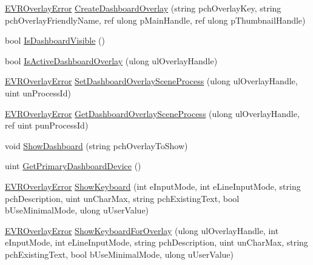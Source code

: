 \begin{DoxyCompactItemize}
\item 
\mbox{\hyperlink{namespace_valve_1_1_v_r_aaee5c5144f42b7969d45b854f51b0c18}{E\+V\+R\+Overlay\+Error}} \mbox{\hyperlink{class_valve_1_1_v_r_1_1_c_v_r_overlay_a3010fee626abfe4227ccbf2c53186508}{Create\+Dashboard\+Overlay}} (string pch\+Overlay\+Key, string pch\+Overlay\+Friendly\+Name, ref ulong p\+Main\+Handle, ref ulong p\+Thumbnail\+Handle)
\item 
bool \mbox{\hyperlink{class_valve_1_1_v_r_1_1_c_v_r_overlay_a2f8245632633538da1d5a48addc76559}{Is\+Dashboard\+Visible}} ()
\item 
bool \mbox{\hyperlink{class_valve_1_1_v_r_1_1_c_v_r_overlay_a68413569ad106e17b3503f392f11de76}{Is\+Active\+Dashboard\+Overlay}} (ulong ul\+Overlay\+Handle)
\item 
\mbox{\hyperlink{namespace_valve_1_1_v_r_aaee5c5144f42b7969d45b854f51b0c18}{E\+V\+R\+Overlay\+Error}} \mbox{\hyperlink{class_valve_1_1_v_r_1_1_c_v_r_overlay_ae2953273d370a8ecbbac3513392cfc09}{Set\+Dashboard\+Overlay\+Scene\+Process}} (ulong ul\+Overlay\+Handle, uint un\+Process\+Id)
\item 
\mbox{\hyperlink{namespace_valve_1_1_v_r_aaee5c5144f42b7969d45b854f51b0c18}{E\+V\+R\+Overlay\+Error}} \mbox{\hyperlink{class_valve_1_1_v_r_1_1_c_v_r_overlay_a1741a80ecf6cd56ce4374955e81791e4}{Get\+Dashboard\+Overlay\+Scene\+Process}} (ulong ul\+Overlay\+Handle, ref uint pun\+Process\+Id)
\item 
void \mbox{\hyperlink{class_valve_1_1_v_r_1_1_c_v_r_overlay_ac731a2fc3a7a6a3fc3bfb949545cf986}{Show\+Dashboard}} (string pch\+Overlay\+To\+Show)
\item 
uint \mbox{\hyperlink{class_valve_1_1_v_r_1_1_c_v_r_overlay_af060f8de9c6282c904fe3cc6ba6fc186}{Get\+Primary\+Dashboard\+Device}} ()
\item 
\mbox{\hyperlink{namespace_valve_1_1_v_r_aaee5c5144f42b7969d45b854f51b0c18}{E\+V\+R\+Overlay\+Error}} \mbox{\hyperlink{class_valve_1_1_v_r_1_1_c_v_r_overlay_a1f615d854db640debe761d4d9b43e118}{Show\+Keyboard}} (int e\+Input\+Mode, int e\+Line\+Input\+Mode, string pch\+Description, uint un\+Char\+Max, string pch\+Existing\+Text, bool b\+Use\+Minimal\+Mode, ulong u\+User\+Value)
\item 
\mbox{\hyperlink{namespace_valve_1_1_v_r_aaee5c5144f42b7969d45b854f51b0c18}{E\+V\+R\+Overlay\+Error}} \mbox{\hyperlink{class_valve_1_1_v_r_1_1_c_v_r_overlay_ac60a45b04d035b5abff6a25e3e3f9ed6}{Show\+Keyboard\+For\+Overlay}} (ulong ul\+Overlay\+Handle, int e\+Input\+Mode, int e\+Line\+Input\+Mode, string pch\+Description, uint un\+Char\+Max, string pch\+Existing\+Text, bool b\+Use\+Minimal\+Mode, ulong u\+User\+Value)

\end{DoxyCompactItemize}
